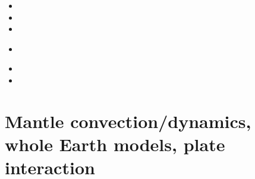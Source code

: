 \begin{small}
\begin{itemize}
\item[\nineteeneightytwo] 
\item[\nineteeneightyseven] 
\item[\twothousandfour] 
\item[\twothousandtwelve] 
 \\
\item[\twothousandfourteen] 
\item[\twothousandeighteen] 
\end{itemize}
\end{small}

\section{Mantle convection/dynamics, whole Earth models, plate interaction}

